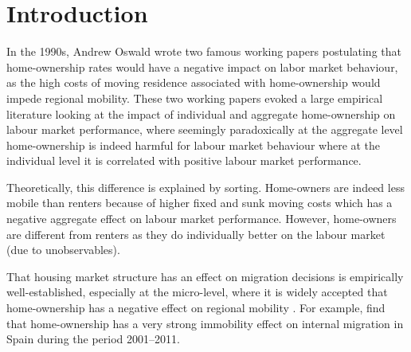 \documentclass[fleqn,10pt]{SelfArx} %
\affiliation{\textsuperscript{1}\textit{Department of Spatial Economics, Vrije Universiteit Amsterdam, Amsterdam, The Netherlands}} %
\affiliation{*\textbf{Corresponding author}: \Letter{} t.de.graaff@vu.n; \Mundus{} \href{thomasdegraaff.nl}{thomasdegraaff.nl}} %
\begin{document}
	
	\flushbottom %
	\maketitle %
	\thispagestyle{empty} %
	
	
	\section{Introduction} %

        In the 1990s, Andrew Oswald wrote two famous working papers
        \citep{oswald1996conjecture, oswald1999housing} postulating
        that home-ownership rates would have a negative impact on labor
        market behaviour, as the high costs of moving residence
        associated with home-ownership would impede regional
        mobility. These two working papers evoked a large empirical
        literature \citep[see, e.g., ][]{munch2006homeowners,
          munch2008home, de2013european} looking at the impact of
        individual and aggregate home-ownership on labour market
        performance, where seemingly paradoxically at the aggregate
        level home-ownership is indeed harmful for labour market
        behaviour where at the individual level it is correlated with
        positive labour market performance.
        
        Theoretically, this difference is explained by sorting. Home-owners are indeed less mobile than renters because of higher fixed and sunk moving costs which has a negative aggregate effect on 
        labour market performance. However, home-owners are different from renters as they do individually
        better on the labour market (due to unobservables). 

        That housing market structure has an effect on migration
        decisions is empirically well-established, especially at the micro-level,
        where it is widely accepted that home-ownership has a negative
        effect on regional mobility \citep{dietz2003social}. For
        example, \citet{palomares2018understanding} find that
        home-ownership has a very strong immobility effect on
        internal migration in Spain during the period 2001--2011.
\end{document}
